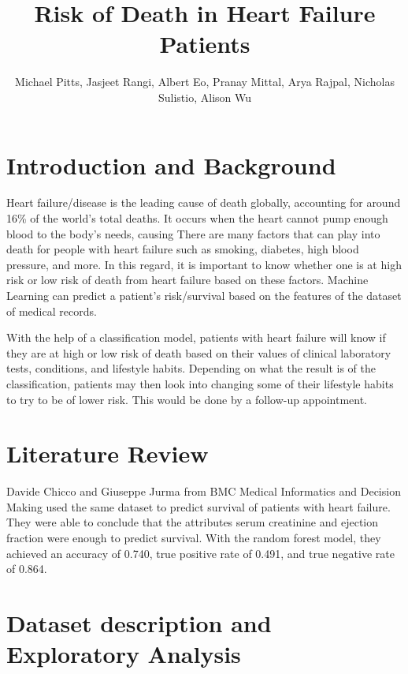 \documentclass[11pt]{article}
\begin{document}
\title{Risk of Death in Heart Failure Patients}
\author{Michael Pitts, Jasjeet Rangi, Albert Eo, Pranay Mittal, Arya Rajpal,
Nicholas Sulistio, Alison Wu}


\maketitle

\section{Introduction and Background}

{Heart failure/disease is the leading cause of death globally, accounting for 
around 16\% of the world’s total deaths. It occurs when the heart cannot pump 
enough blood to the body’s needs, causing  There are many factors that can play 
into death for people with heart failure such as smoking, diabetes, high blood 
pressure, and more. In this regard, it is important to know whether one is at 
high risk or low risk of death from heart failure based on these factors. 
Machine Learning can predict a patient’s risk/survival based on the features of 
the dataset of medical records.

With the help of a classification model, patients with heart failure will know 
if they are at high or low risk of death based on their values of clinical 
laboratory tests, conditions, and lifestyle habits. Depending on what the 
result is of the classification, patients may then look into changing some of 
their lifestyle habits to try to be of lower risk. This would be done by a 
follow-up appointment.}


\section{Literature Review}

{Davide Chicco and Giuseppe Jurma from BMC Medical Informatics and
Decision Making used the same dataset to predict survival of patients
with heart failure. They were able to conclude that the attributes serum
creatinine and ejection fraction were enough to predict survival. With
the random forest model, they achieved an accuracy of 0.740, true
positive rate of 0.491, and true negative rate of 0.864.}

{}

\section{Dataset description and Exploratory Analysis}
\end{document}
